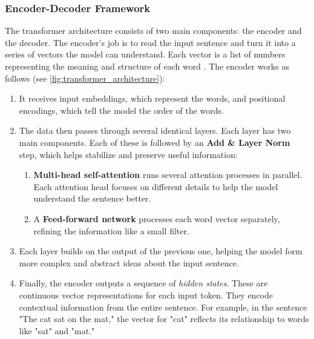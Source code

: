     \subsubsection{Encoder-Decoder Framework} \label{subsection:encoder-decoder}
    The transformer architecture consists of two main components: the encoder and the decoder. The encoder’s job is to read the input sentence and turn it into a series of vectors the model can understand. Each vector is a list of numbers representing the meaning and structure of each word \parencite{xiaoIntroductionTransformersNLP2023}. The encoder works as follows (see \autoref{fig:transformer_architecture}):

    \begin{enumerate}
        \item It receives input embeddings, which represent the words, and positional encodings, which tell the model the order of the words.
        
        \item The data then passes through several identical layers. Each layer has two main components. Each of these is followed by an \textbf{Add \& Layer Norm} step, which helps stabilize and preserve useful information:
        \begin{enumerate}[label=\alph*.]
            \item \textbf{Multi-head self-attention} runs several attention processes in parallel. Each attention head focuses on different details to help the model understand the sentence better.
            \item A \textbf{Feed-forward network} processes each word vector separately, refining the information like a small filter.
    \end{enumerate}
    
    \item Each layer builds on the output of the previous one, helping the model form more complex and abstract ideas about the input sentence.
    
    \item Finally, the encoder outputs a sequence of \textit{hidden states}. These are continuous vector representations for each input token. They encode contextual information from the entire sentence. For example, in the sentence "The cat sat on the mat," the vector for "cat" reflects its relationship to words like "sat" and "mat."
\end{enumerate}

